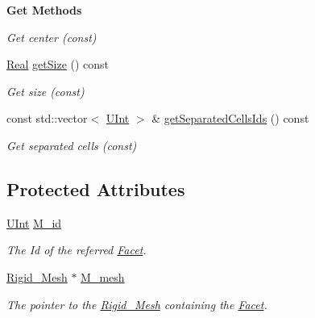 \begin{Indent}{\bf Get Methods}
\begin{DoxyCompactItemize}
\begin{DoxyCompactList}\small\item\em Get center (const) \end{DoxyCompactList}\item 
\hyperlink{namespaceFVCode3D_a40c1f5588a248569d80aa5f867080e83}{Real} \hyperlink{classFVCode3D_1_1Rigid__Mesh_1_1Facet__ID_a6fb6374e6750efc29b8ca9fa4d329d7b}{get\+Size} () const 
\begin{DoxyCompactList}\small\item\em Get size (const) \end{DoxyCompactList}\item 
const std\+::vector$<$ \hyperlink{namespaceFVCode3D_a4bf7e328c75d0fd504050d040ebe9eda}{U\+Int} $>$ \& \hyperlink{classFVCode3D_1_1Rigid__Mesh_1_1Facet__ID_a87b05e8b8c516f2be5067b881e368d6b}{get\+Separated\+Cells\+Ids} () const 
\begin{DoxyCompactList}\small\item\em Get separated cells (const) \end{DoxyCompactList}\end{DoxyCompactItemize}
\end{Indent}
\subsection*{Protected Attributes}
\begin{DoxyCompactItemize}
\item 
\hyperlink{namespaceFVCode3D_a4bf7e328c75d0fd504050d040ebe9eda}{U\+Int} \hyperlink{classFVCode3D_1_1Rigid__Mesh_1_1Facet__ID_ab8d2dc7ef7f4f606b92a76280b7ac946}{M\+\_\+id}
\begin{DoxyCompactList}\small\item\em The Id of the referred \hyperlink{classFVCode3D_1_1Rigid__Mesh_1_1Facet}{Facet}. \end{DoxyCompactList}\item 
\hyperlink{classFVCode3D_1_1Rigid__Mesh}{Rigid\+\_\+\+Mesh} $\ast$ \hyperlink{classFVCode3D_1_1Rigid__Mesh_1_1Facet__ID_acd3810a3b4989320c21f7574354e7915}{M\+\_\+mesh}
\begin{DoxyCompactList}\small\item\em The pointer to the \hyperlink{classFVCode3D_1_1Rigid__Mesh}{Rigid\+\_\+\+Mesh} containing the \hyperlink{classFVCode3D_1_1Rigid__Mesh_1_1Facet}{Facet}. \end{DoxyCompactList}\end{DoxyCompactItemize}


